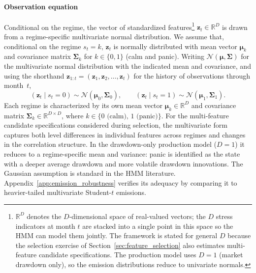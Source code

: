 \paragraph{Observation equation}
Conditional on the regime, the vector of standardized features\footnote{$\mathbb{R}^D$ denotes the $D$-dimensional space of real-valued vectors; the $D$ stress indicators at month $t$ are stacked into a single point in this space so the HMM can model them jointly. The framework is stated for general $D$ because the selection exercise of Section~\ref{sec:feature_selection} also estimates multi-feature candidate specifications. The production model uses $D = 1$ (market drawdown only), so the emission distributions reduce to univariate normals.} $\mathbf{z}_t \in \mathbb{R}^D$ is drawn from a regime-specific multivariate normal distribution. We assume that, conditional on the regime $s_t = k$, $\mathbf{z}_t$ is normally distributed with mean vector $\boldsymbol{\mu}_k$ and covariance matrix $\boldsymbol{\Sigma}_k$ for $k \in \{0, 1\}$ (calm and panic). Writing $\mathcal{N}(\boldsymbol{\mu}, \boldsymbol{\Sigma})$ for the multivariate normal distribution with the indicated mean and covariance, and using the shorthand $\mathbf{z}_{1:t} = (\mathbf{z}_1, \mathbf{z}_2, \dots, \mathbf{z}_t)$ for the history of observations through month~$t$,
\begin{equation}
    (\mathbf{z}_t \mid s_t = 0) \sim \mathcal{N}(\boldsymbol{\mu}_0, \boldsymbol{\Sigma}_0), \qquad (\mathbf{z}_t \mid s_t = 1) \sim \mathcal{N}(\boldsymbol{\mu}_1, \boldsymbol{\Sigma}_1).
\end{equation}
Each regime is characterized by its own mean vector $\boldsymbol{\mu}_k \in \mathbb{R}^D$ and covariance matrix $\boldsymbol{\Sigma}_k \in \mathbb{R}^{D \times D}$, where $k \in \{0\text{ (calm)},\, 1\text{ (panic)}\}$. For the multi-feature candidate specifications considered during selection, the multivariate form captures both level differences in individual features across regimes and changes in the correlation structure. In the drawdown-only production model ($D = 1$) it reduces to a regime-specific mean and variance: panic is identified as the state with a deeper average drawdown and more volatile drawdown innovations. The Gaussian assumption is standard in the HMM literature. Appendix~\ref{app:emission_robustness} verifies its adequacy by comparing it to heavier-tailed multivariate Student-$t$ emissions.

